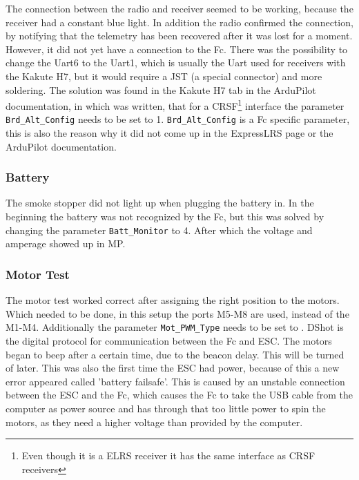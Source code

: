 \documentclass[svgnames]{article}
\begin{document}
	The connection between the radio and receiver seemed to be working, because the receiver had a constant blue light. In addition the radio confirmed the connection, by notifying that the telemetry has been recovered after it was lost for a moment. However, it did not yet have a connection to the Fc. There was the possibility to change the Uart6 to the Uart1, which is usually the Uart used for receivers with the Kakute H7, but it would require a JST (a special connector) and more soldering. The solution was found in the Kakute H7 tab in the ArduPilot documentation, in which was written, that for a CRSF\footnote{Even though it is a ELRS receiver it has the same interface as CRSF receivers} interface the parameter \lstinline|Brd_Alt_Config| needs to be set to 1. \lstinline|Brd_Alt_Config| is a Fc specific parameter, this is also the reason why it did not come up in the ExpressLRS page or the ArduPilot documentation. 

	\subsubsection{Battery}
	The smoke stopper did not light up when plugging the battery in. In the beginning the battery was not recognized by the \gls{Fc}, but this was solved by changing the parameter \lstinline|Batt_Monitor| to 4. After which the voltage and amperage showed up in \gls{MP}.

	\subsubsection{Motor Test}
	The motor test worked correct after assigning the right position to the motors. Which needed to be done, in this setup the ports M5-M8 are used, instead of the M1-M4. Additionally the parameter \lstinline|Mot_PWM_Type| needs to be set to . \Gls{DShot} is the digital protocol for communication between the \gls{Fc} and \gls{ESC}. The motors began to beep after a certain time, due to the beacon delay. This will be turned of later. This was also the first time the \gls{ESC} had power, because of this a new error appeared called 'battery failsafe'. This is caused by an unstable connection between the \gls{ESC} and the \gls{Fc}, which causes the \gls{Fc} to take the USB cable from the computer as power source and has through that too little power to spin the motors, as they need a higher voltage than provided by the computer.
	
\end{document}
